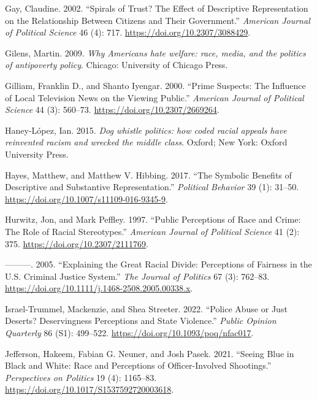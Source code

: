 \documentclass[
  12pt,
]{article}
\newlength{\cslhangindent}
\newlength{\cslentryspacingunit} %
\newenvironment{CSLReferences}[2] %
 {%
  \setlength{\parindent}{0pt}
  \ifodd #1
  \let\oldpar\par
  \def\par{\hangindent=\cslhangindent\oldpar}
  \fi
  \setlength{\parskip}{#2\cslentryspacingunit}
 }%
 {}
\begin{document}
\begin{CSLReferences}{1}{0}
\leavevmode{}%
Gay, Claudine. 2002. {``Spirals of Trust? The Effect of Descriptive
Representation on the Relationship Between Citizens and Their
Government.''} \emph{American Journal of Political Science} 46 (4): 717.
\url{https://doi.org/10.2307/3088429}.

\leavevmode{}%
Gilens, Martin. 2009. \emph{Why Americans hate welfare: race, media, and
the politics of antipoverty policy}. Chicago: University of Chicago
Press.

\leavevmode{}%
Gilliam, Franklin D., and Shanto Iyengar. 2000. {``Prime Suspects: The
Influence of Local Television News on the Viewing Public.''}
\emph{American Journal of Political Science} 44 (3): 560--73.
\url{https://doi.org/10.2307/2669264}.

\leavevmode{}%
Haney-López, Ian. 2015. \emph{Dog whistle politics: how coded racial
appeals have reinvented racism and wrecked the middle class}. Oxford;
New York: Oxford University Press.

\leavevmode{}%
Hayes, Matthew, and Matthew V. Hibbing. 2017. {``The Symbolic Benefits
of Descriptive and Substantive Representation.''} \emph{Political
Behavior} 39 (1): 31--50.
\url{https://doi.org/10.1007/s11109-016-9345-9}.

\leavevmode{}%
Hurwitz, Jon, and Mark Peffley. 1997. {``Public Perceptions of Race and
Crime: The Role of Racial Stereotypes.''} \emph{American Journal of
Political Science} 41 (2): 375. \url{https://doi.org/10.2307/2111769}.

\leavevmode{}%
---------. 2005. {``Explaining the Great Racial Divide: Perceptions of
Fairness in the U.S. Criminal Justice System.''} \emph{The Journal of
Politics} 67 (3): 762--83.
\url{https://doi.org/10.1111/j.1468-2508.2005.00338.x}.

\leavevmode{}%
Israel-Trummel, Mackenzie, and Shea Streeter. 2022. {``Police Abuse or
Just Deserts? Deservingness Perceptions and State Violence.''}
\emph{Public Opinion Quarterly} 86 (S1): 499--522.
\url{https://doi.org/10.1093/poq/nfac017}.

\leavevmode{}%
Jefferson, Hakeem, Fabian G. Neuner, and Josh Pasek. 2021. {``Seeing
Blue in Black and White: Race and Perceptions of Officer-Involved
Shootings.''} \emph{Perspectives on Politics} 19 (4): 1165--83.
\url{https://doi.org/10.1017/S1537592720003618}.


\end{CSLReferences}
\end{document}
